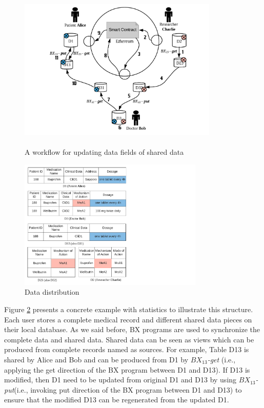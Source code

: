 \documentclass[conference]{IEEEtran}
\begin{document}
\begin{figure}[htbp]
    \centerline{\includegraphics[width=270pt,height=220pt]{updateScenario.pdf}}
    \caption{A workflow for updating data fields of shared data}
    \label{workflow}
\end{figure}

\begin{figure}[htbp]
    \centerline{\includegraphics[width=250pt]{medicalData.pdf}}
    \caption{Data distribution}
    \label{dataRepresentation}
\end{figure}

Figure \ref{dataRepresentation} presents a concrete example with statistics to illustrate this structure. Each user stores a complete medical record and different shared data pieces on their local database.
As we said before, BX programs are used to synchronize the complete data and shared data. Shared data can be seen as views which can be produced from complete records named as sources. For example, Table D13 is shared by Alice and Bob and can be produced from D1 by \emph{$BX_{13}$-get} (i.e., applying the get direction of the BX program between D1 and D13). If D13 is modified, then D1 need to be updated from original D1 and D13 by using  \emph{$BX_{13}$-put}(i.e., invoking put direction of the BX program between D1 and D13) to ensure that the modified D13 can be regenerated from the updated D1.  
\end{document}
